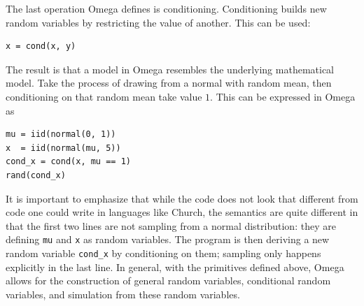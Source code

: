 The last operation Omega defines is conditioning. Conditioning builds new random variables by restricting the value of another. This can be used:
\begin{center}
\begin{minipage}{5cm}
\begin{Verbatim}[fontsize=\small]
x = cond(x, y)
\end{Verbatim}
\end{minipage}
\end{center}
The result is that a model in Omega resembles the underlying mathematical model. Take the process of drawing from a normal with random mean, then conditioning on that
random mean take value $1$. This can be expressed in Omega as
\begin{center}
\begin{minipage}{5cm}
\begin{Verbatim}[fontsize=\small]
mu = iid(normal(0, 1))
x  = iid(normal(mu, 5))
cond_x = cond(x, mu == 1)
rand(cond_x)
\end{Verbatim}
\end{minipage}
\end{center}
It is important to emphasize that while the code does not look that different from code one could write in languages like Church, the semantics are quite different in that the first two lines are not sampling from a normal distribution: they are defining \texttt{mu} and \texttt{x} as random variables. The program is then deriving a new random variable \texttt{cond\_x} by conditioning on them; sampling only happens explicitly in the last line. In general, with the primitives defined above, 
Omega allows for the construction of general random variables,
conditional random variables, and simulation from these random variables. 

